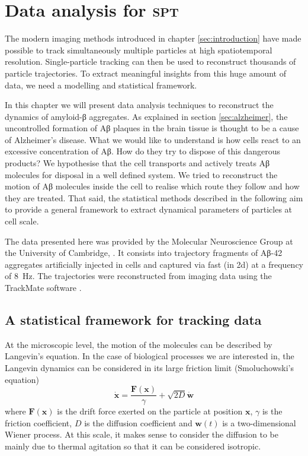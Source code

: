 
\chapter{Data analysis for \textsc{spt}}\label{sec:data_analysis}


The modern imaging methods introduced in chapter \ref{sec:introduction} have made possible to track simultaneously multiple particles at high spatiotemporal resolution. Single-particle tracking can then be used to reconstruct thousands of particle trajectories. To extract meaningful insights from this huge amount of data, we need a modelling and statistical framework.

In this chapter we will present data analysis techniques to reconstruct the dynamics of amyloid-β aggregates. As explained in section \ref{sec:alzheimer}, the uncontrolled formation of Aβ plaques in the brain tissue is thought to be a cause of Alzheimer's disease. What we would like to understand is how cells react to an excessive concentration of Aβ. How do they try to dispose of this dangerous products? We hypothesise that the cell transports and actively treats Aβ molecules for disposal in a well defined system. We tried to reconstruct the motion of Aβ molecules inside the cell to realise which route they follow and how they are treated. That said, the statistical methods described in the following aim to provide a general framework to extract dynamical parameters of particles at cell scale.

The data presented here was provided by the Molecular Neuroscience Group at the University of Cambridge, . It consists into trajectory fragments of Aβ-42 aggregates artificially injected in  cells and captured via fast  (in 2d) at a frequency of \SI{8}{\hertz}. The trajectories were reconstructed from imaging data using the TrackMate software .

\section{A statistical framework for tracking data}

At the microscopic level, the motion of the molecules can be described by Langevin's equation. In the case of biological processes we are interested in, the Langevin dynamics can be considered in its large friction limit (Smoluchowski's equation) 
\begin{equation} \label{eq:smoluchowski}
 \dot{\bm{x}} = \frac{\bm{F}(\bm{x})}{\gamma} + \sqrt{2D} \dot{\bm{w}}
\end{equation}
where $\bm{F}(\bm{x})$ is the drift force exerted on the particle at position $\bm{x}$, $\gamma$ is the friction coefficient, $D$ is the diffusion coefficient and $\bm{w}(t)$ is a two-dimensional Wiener process. At this scale, it makes sense to consider the diffusion to be mainly due to thermal agitation so that it can be considered isotropic.

